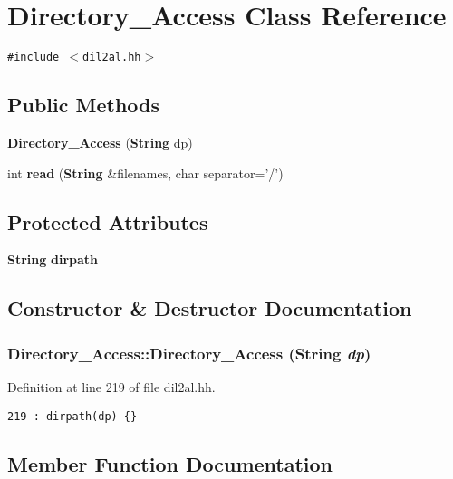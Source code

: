 \section{Directory\_\-Access  Class Reference}
\label{classDirectory__Access}
{\tt \#include $<$dil2al.hh$>$}

\subsection*{Public Methods}
\begin{CompactItemize}
\item 
{\bf Directory\_\-Access} ({\bf String} dp)
\item 
int {\bf read} ({\bf String} \&filenames, char separator='/')
\end{CompactItemize}
\subsection*{Protected Attributes}
\begin{CompactItemize}
\item 
{\bf String} {\bf dirpath}
\end{CompactItemize}


\subsection{Constructor \& Destructor Documentation}
\subsubsection{\setlength{\rightskip}{0pt plus 5cm}Directory\_\-Access::Directory\_\-Access ({\bf String} {\em dp})\hspace{0.3cm}{\tt  [inline]}}\label{classDirectory__Access_a0}




Definition at line 219 of file dil2al.hh.



\footnotesize\begin{verbatim}219 : dirpath(dp) {}
\end{verbatim}\normalsize 


\subsection{Member Function Documentation}
